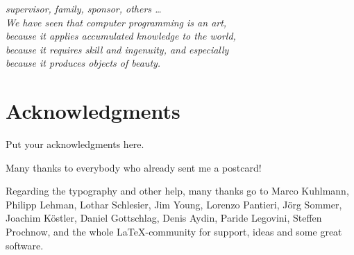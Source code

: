 \thispagestyle{empty}
\begin{flushright}{\slshape%
	supervisor, family, sponsor, others \ldots \\
    We have seen that computer programming is an art, \\ 
    because it applies accumulated knowledge to the world, \\ 
    because it requires skill and ingenuity, and especially \\
    because it produces objects of beauty.} \\ \medskip
\end{flushright}



\bigskip

\begingroup
\let\clearpage\relax
\let\cleardoublepage\relax
\let\cleardoublepage\relax
\section*{Acknowledgments}
Put your acknowledgments here.

Many thanks to everybody who already sent me a postcard!

Regarding the typography and other help, many thanks go to Marco 
Kuhlmann, Philipp Lehman, Lothar Schlesier, Jim Young, Lorenzo 
Pantieri, J\"org Sommer, Joachim K\"ostler, Daniel 
Gottschlag, Denis Aydin, Paride Legovini, Steffen Prochnow, 
and the whole \LaTeX-community for support, ideas and some great 
software.

\endgroup



